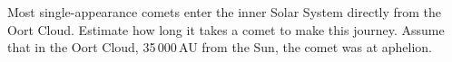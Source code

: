 Most single-appearance comets enter the inner Solar System directly from the
Oort Cloud. Estimate how long it takes a comet to make this journey. Assume
that in the Oort Cloud, 35\,000\,AU from the Sun, the comet was at aphelion.
